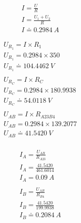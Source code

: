 \begin{figure}
    \begin{gather*}
        I = \frac{U}{R} \\
        I = \frac{U_1 + U_2}{R} \\
        I \doteq 0.2984 \: A
    \end{gather*}
\end{figure}


\begin{figure}
    \begin{gather*}
        U_{R_1} = I \times R_1 \\
        U_{R_1} = 0.2984 \times 350 \\
        U_{R_1} \doteq 104.4462 \: V \\
        \\
        U_{R_C} = I \times R_C \\
        U_{R_C} = 0.2984 \times 180.9938 \\
        U_{R_C} \doteq 54.0118 \: V \\
        \\
        U_{AB} = I \times R_{A23B4} \\
        U_{AB} = 0.2984 \times 139.2077 \\
        U_{AB} \doteq 41.5420 \: V \\
    \end{gather*}
\end{figure}

\begin{figure}
    \begin{gather*}
        I_A = \frac{U_{AB}}{R_{A23}} \\
        I_A = \frac{41.5420}{461.6014} \\
        I_A = 0.09 \: A \\
        \\
        I_B = \frac{U_{AB}}{R_{B4}} \\
        I_B = \frac{41.5420}{199.9938} \\
        I_B \doteq 0.2084 \: A \\
    \end{gather*}
\end{figure}

